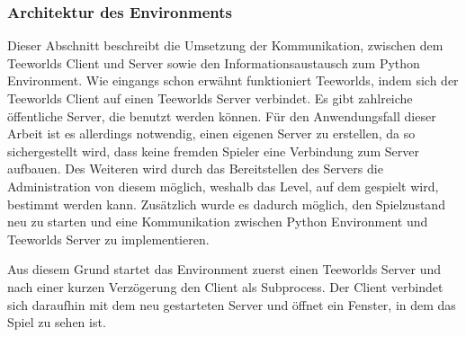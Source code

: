 \documentclass[11pt]{scrartcl}
\begin{document}
\subsubsection{Architektur des Environments}
\label{sec:architecture-env}
Dieser Abschnitt beschreibt die Umsetzung der Kommunikation, zwischen dem Teeworlds Client
und Server sowie den Informationsaustausch zum Python Environment. Wie eingangs schon
erwähnt funktioniert Teeworlds, indem sich der Teeworlds Client auf einen Teeworlds Server
verbindet. Es gibt zahlreiche öffentliche Server, die benutzt werden können. Für den
Anwendungsfall dieser Arbeit ist es allerdings notwendig, einen eigenen Server zu erstellen,
da so sichergestellt wird, dass keine fremden Spieler eine Verbindung zum Server aufbauen.
Des Weiteren wird durch das Bereitstellen des Servers die Administration von diesem möglich,
weshalb das Level, auf dem gespielt wird, bestimmt werden kann. Zusätzlich wurde
es dadurch möglich, den Spielzustand neu zu starten und eine Kommunikation zwischen Python
Environment und Teeworlds Server zu implementieren.

Aus diesem Grund startet das Environment zuerst einen Teeworlds Server und nach einer
kurzen Verzögerung den Client als Subprocess. Der Client verbindet sich daraufhin mit dem
neu gestarteten Server und öffnet ein Fenster, in dem das Spiel zu sehen ist.
\end{document}
